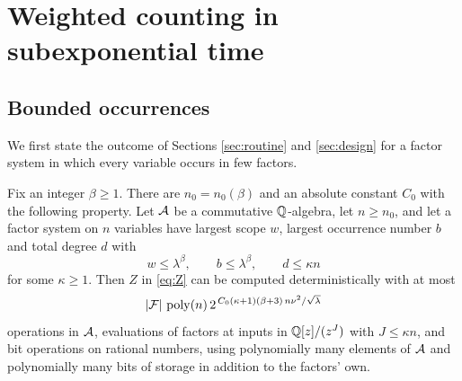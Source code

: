 \section{Weighted counting in subexponential time}\label{sec:weighted}

\subsection{Bounded occurrences}
We first state the outcome of Sections \ref{sec:routine} and \ref{sec:design}
for a factor system in which every variable occurs in few factors.

\begin{theorem}\label{thm:bounded-occ}
Fix an integer $\beta\ge1$. There are $n_0=n_0(\beta)$ and an absolute constant
$C_0$ with the following property. Let $\mathcal{A}$ be a commutative $\mathbb{Q}$-algebra, let
$n\ge n_0$, and let a factor system on $n$ variables have largest scope $w$,
largest occurrence number $b$ and total degree $d$ with
\[
  w\le\lambda^{\beta},\qquad b\le\lambda^{\beta},\qquad d\le\kappa n
\]
for some $\kappa\ge1$. Then $Z$ in \eqref{eq:Z} can be computed deterministically
with at most
\begin{equation}\label{eq:boundedocc}
  |\mathcal{F}|\,\operatorname{poly}(n)\,2^{\,C_0(\kappa+1)(\beta+3)\,n\nu^2/\sqrt\lambda}
\end{equation}
operations in $\mathcal{A}$, evaluations of factors at inputs in $\mathbb{Q}[z]/(z^{J})$ with
$J\le\kappa n$, and bit operations on rational numbers, using polynomially many
elements of $\mathcal{A}$ and polynomially many bits of storage in addition to the
factors' own.
\end{theorem}

